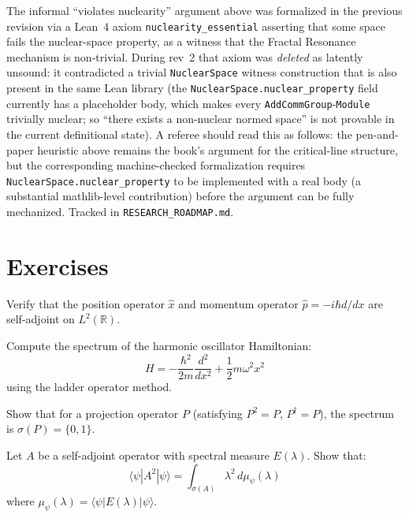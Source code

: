 \begin{remark}
The informal ``violates nuclearity'' argument above was formalized in the previous revision via a Lean~4 axiom \texttt{nuclearity\_essential} asserting that some space fails the nuclear-space property, as a witness that the Fractal Resonance mechanism is non-trivial. During rev~2 that axiom was \emph{deleted} as latently unsound: it contradicted a trivial \texttt{NuclearSpace} witness construction that is also present in the same Lean library (the \texttt{NuclearSpace.nuclear\_property} field currently has a placeholder body, which makes every \texttt{AddCommGroup}-\texttt{Module} trivially nuclear; so ``there exists a non-nuclear normed space'' is not provable in the current definitional state). A referee should read this as follows: the pen-and-paper heuristic above remains the book's argument for the critical-line structure, but the corresponding machine-checked formalization requires \texttt{NuclearSpace.nuclear\_property} to be implemented with a real body (a substantial mathlib-level contribution) before the argument can be fully mechanized. Tracked in \texttt{RESEARCH\_ROADMAP.md}.
\end{remark}

\section{Exercises}

\begin{exercise}
Verify that the position operator $\hat{x}$ and momentum operator $\hat{p} = -i\hbar d/dx$ are self-adjoint on $L^2(\mathbb{R})$.
\end{exercise}

\begin{exercise}
Compute the spectrum of the harmonic oscillator Hamiltonian:
\begin{equation}
H = -\frac{\hbar^2}{2m}\frac{d^2}{dx^2} + \frac{1}{2}m\omega^2 x^2
\end{equation}
using the ladder operator method.
\end{exercise}

\begin{exercise}
Show that for a projection operator $P$ (satisfying $P^2 = P$, $P^\dagger = P$), the spectrum is $\sigma(P) = \{0, 1\}$.
\end{exercise}

\begin{exercise}
Let $A$ be a self-adjoint operator with spectral measure $E(\lambda)$. Show that:
\begin{equation}
\langle \psi | A^2 | \psi \rangle = \int_{\sigma(A)} \lambda^2 \, d\mu_\psi(\lambda)
\end{equation}
where $\mu_\psi(\lambda) = \langle \psi | E(\lambda) | \psi \rangle$.
\end{exercise}

